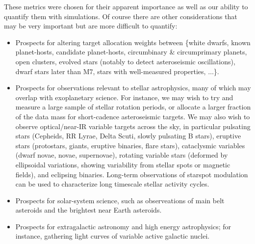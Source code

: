 These metrics were chosen for their apparent importance as well as our
ability to quantify them with simulations. Of course there are other considerations
that may be very important but are more difficult to quantify:
\begin{itemize}
\item Prospects for altering target allocation weights between \{white
  dwarfs, known planet-hosts, candidate planet-hosts, circumbinary \&
  circumprimary planets, open clusters, evolved stars (notably to
  detect asteroseismic oscillations), dwarf stars later than M7, stars
  with well-measured properties, $\ldots$\}.
\item Prospects for observations relevant to stellar astrophysics, many of which may overlap with exoplanetary science.
    For instance, we may wish to try and measure a large sample of stellar rotation periods, or allocate a larger fraction of the data mass for short-cadence asteroseismic targets.
    We may also wish to observe optical/near-IR variable targets across the sky, in particular 
	pulsating stars (Cepheids, RR Lyrae, Delta Scuti, slowly pulsating B stars),
	eruptive stars (protostars, giants, eruptive binaries, flare stars), 
	cataclysmic variables (dwarf novae, novae, supernovae), 
	rotating variable stars (deformed by ellipsoidal variations, showing variability from stellar spots or magnetic fields),
	and eclipsing binaries.
	Long-term observations of starspot modulation can be used to characterize long timescale stellar activity cycles.
\item Prospects for solar-system science, such as observeations of main belt asteroids and the brightest near Earth asteroids.
\item Prospects for extragalactic astronomy and high energy astrophysics; for instance, gathering light curves of variable active galactic nuclei.
\end{itemize}

